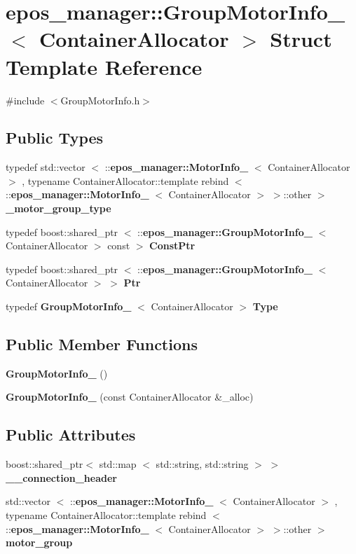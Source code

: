 \section{epos\-\_\-manager\-:\-:\-Group\-Motor\-Info\-\_\-$<$ \-Container\-Allocator $>$ \-Struct \-Template \-Reference}
\label{structepos__manager_1_1GroupMotorInfo__}


{\ttfamily \#include $<$\-Group\-Motor\-Info.\-h$>$}

\subsection*{\-Public \-Types}
\begin{DoxyCompactItemize}
\item 
typedef std\-::vector\*
$<$ \-::{\bf epos\-\_\-manager\-::\-Motor\-Info\-\_\-}\*
$<$ \-Container\-Allocator $>$\*
, typename \*
\-Container\-Allocator\-::template \*
rebind\*
$<$ \-::{\bf epos\-\_\-manager\-::\-Motor\-Info\-\_\-}\*
$<$ \-Container\-Allocator $>$\*
 $>$\-::other $>$ {\bf \-\_\-motor\-\_\-group\-\_\-type}
\item 
typedef boost\-::shared\-\_\-ptr\*
$<$ \-::{\bf epos\-\_\-manager\-::\-Group\-Motor\-Info\-\_\-}\*
$<$ \-Container\-Allocator $>$ const  $>$ {\bf \-Const\-Ptr}
\item 
typedef boost\-::shared\-\_\-ptr\*
$<$ \-::{\bf epos\-\_\-manager\-::\-Group\-Motor\-Info\-\_\-}\*
$<$ \-Container\-Allocator $>$ $>$ {\bf \-Ptr}
\item 
typedef {\bf \-Group\-Motor\-Info\-\_\-}\*
$<$ \-Container\-Allocator $>$ {\bf \-Type}
\end{DoxyCompactItemize}
\subsection*{\-Public \-Member \-Functions}
\begin{DoxyCompactItemize}
\item 
{\bf \-Group\-Motor\-Info\-\_\-} ()
\item 
{\bf \-Group\-Motor\-Info\-\_\-} (const \-Container\-Allocator \&\-\_\-alloc)
\end{DoxyCompactItemize}
\subsection*{\-Public \-Attributes}
\begin{DoxyCompactItemize}
\item 
boost\-::shared\-\_\-ptr$<$ std\-::map\*
$<$ std\-::string, std\-::string $>$ $>$ {\bf \-\_\-\-\_\-connection\-\_\-header}
\item 
std\-::vector\*
$<$ \-::{\bf epos\-\_\-manager\-::\-Motor\-Info\-\_\-}\*
$<$ \-Container\-Allocator $>$\*
, typename \*
\-Container\-Allocator\-::template \*
rebind\*
$<$ \-::{\bf epos\-\_\-manager\-::\-Motor\-Info\-\_\-}\*
$<$ \-Container\-Allocator $>$\*
 $>$\-::other $>$ {\bf motor\-\_\-group}
\end{DoxyCompactItemize}


